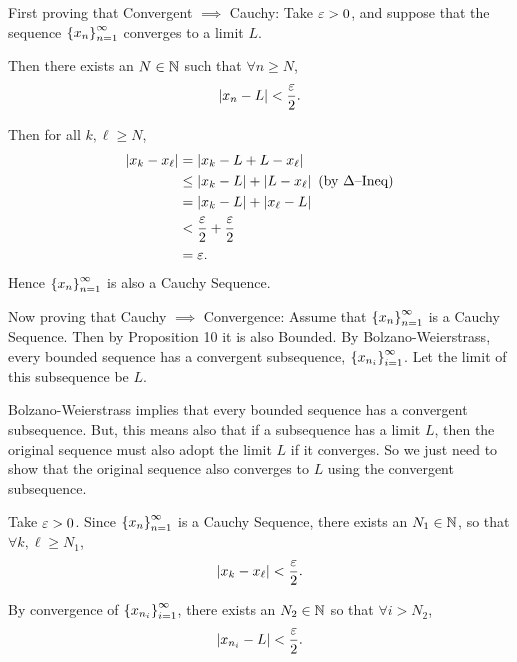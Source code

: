 \documentclass[12pt]{article}
\theoremstyle{definition}
\renewenvironment{proof}[1][\proofname]{\vspace{-10pt}\begin{replacementproof}}{\end{replacementproof}}
\newcommand{\xn}{\set{x_{n}}_{n = 1}^{\infty}}
\begin{document}
    \begin{proof}
        First proving that Convergent $\implies$ Cauchy:
        Take $\varepsilon > 0$, and suppose that the sequence $\xn$ converges to a limit $L$.

        Then there exists an $N \in \mathbb{N}$ such that $\forall n \geq N$, 
        \begin{equation*}
            \left|x_{n} - L\right| < \frac{\varepsilon}{2}.
        \end{equation*}

        Then for all $k, \ell \geq N$, 
        \begin{align*}
            \left|x_{k} - x_{\ell}\right| &= \left|x_{k} - L + L - x_{\ell}\right| \\
                                   &\leq \left|x_{k} - L\right| + \left|L - x_{\ell}\right| ~ \text{(by $\Delta$--Ineq)} \\
                                   &= \left|x_{k} - L\right| + \left|x_{\ell} - L\right| \\
                                   &< \frac{\varepsilon}{2} + \frac{\varepsilon}{2} \\
                                   &= \varepsilon.
        \end{align*}
        Hence $\xn$ is also a Cauchy Sequence.

        Now proving that Cauchy $\implies$ Convergence:
        Assume that $\xn$ is a Cauchy Sequence. Then by Proposition 10 it is also Bounded. By Bolzano-Weierstrass, every bounded sequence has a convergent subsequence, $\left\{x_{n_{i}}\right\}_{i = 1}^{\infty}$. Let the limit of this subsequence be $L$.
        \begin{note}
            Bolzano-Weierstrass implies that every bounded sequence has a convergent subsequence. But, this means also that if a subsequence has a limit $L$, then the original sequence must also adopt the limit $L$ if it converges. So we just need to show that the original sequence also converges to $L$ using the convergent subsequence.
        \end{note}

        Take $\varepsilon > 0$. Since $\xn$ is a Cauchy Sequence, there exists an $N_{1} \in \mathbb{N}$, so that $\forall k, \ell \geq N_{1}$, 
        \begin{equation}
            \left|x_{k} - x_{\ell}\right| < \frac{\varepsilon}{2}.\label{eq:Th4Ineq1}
        \end{equation}
        
        By convergence of $\left\{x_{n_{i}}\right\}_{i = 1}^{\infty}$, there exists an $N_{2} \in \mathbb{N}$ so that $\forall i > N_{2}$, 
        \begin{equation}
            \left|x_{n_{i}} - L\right| < \frac{\varepsilon}{2}.\label{eq:Th4Ineq2}
        \end{equation}


\end{proof}
\end{document}
